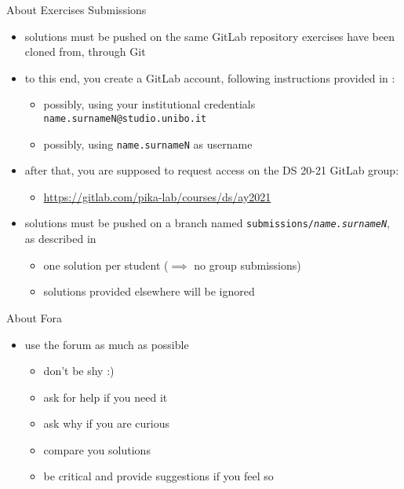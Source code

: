 \documentclass[presentation]{beamer}\mode<presentation>{\usetheme{AMSCesenaPurpleAndGold}}
\begin{document}
\begin{frame}[c]{About Exercises Submissions}

    \begin{itemize}
        \item solutions must be pushed on the same GitLab repository exercises have been cloned from, \alert{through Git}

        \vfill

        \item to this end, you create a GitLab account, following instructions provided in :
        \begin{itemize}
            \item possibly, using your institutional credentials \texttt{\alert{name.surnameN}@studio.unibo.it}
            \item possibly, using \texttt{\alert{name.surnameN}} as username
        \end{itemize}

        \vfill

        \item after that, you are supposed to request access on the DS 20-21 GitLab group:
        \begin{itemize}
            \item \url{https://gitlab.com/pika-lab/courses/ds/ay2021}
        \end{itemize}

        \vfill

        \item solutions must be pushed on a branch named \alert{\texttt{submissions/\textit{name.surnameN}}}, as described in 
        \begin{itemize}
            \item one solution per student ($\implies$ no group submissions)
            \item solutions provided elsewhere will be ignored
        \end{itemize}
    \end{itemize}
\end{frame}

\begin{frame}[c]{About Fora}
    \begin{itemize}
        \item use the forum as much as possible\\
        \begin{itemize}
            \item don't be shy :)
            \item ask for help if you need it
            \item ask why if you are curious
            \item compare you solutions
            \item be critical and provide suggestions if you feel so
        \end{itemize}
    \end{itemize}
\end{frame}
\end{document}
